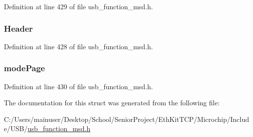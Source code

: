 Definition at line 429 of file usb\+\_\+function\+\_\+msd.\+h.

\hypertarget{struct_mode_sense_response_a9479b3d436ab887d4e3c45f1dd5f7b86}{}
\subsubsection[{Header}]{ Header}\label{struct_mode_sense_response_a9479b3d436ab887d4e3c45f1dd5f7b86}


Definition at line 428 of file usb\+\_\+function\+\_\+msd.\+h.

\hypertarget{struct_mode_sense_response_a8c8f63f79a324a1fe5b468f186d3f16b}{}
\subsubsection[{mode\+Page}]{ mode\+Page}\label{struct_mode_sense_response_a8c8f63f79a324a1fe5b468f186d3f16b}


Definition at line 430 of file usb\+\_\+function\+\_\+msd.\+h.



The documentation for this struct was generated from the following file\+:\begin{DoxyCompactItemize}
\item 
C\+:/\+Users/mainuser/\+Desktop/\+School/\+Senior\+Project/\+Eth\+Kit\+T\+C\+P/\+Microchip/\+Include/\+U\+S\+B/\hyperlink{usb__function__msd_8h}{usb\+\_\+function\+\_\+msd.\+h}\end{DoxyCompactItemize}

